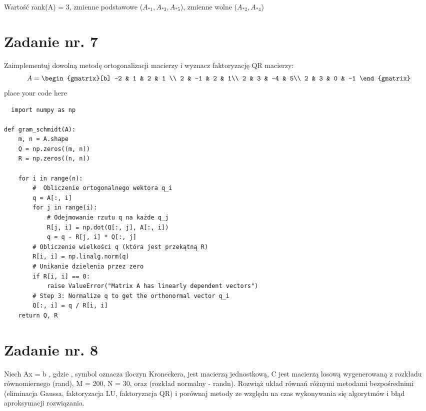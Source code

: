 \documentclass{article}
\begin{document}
Wartość rank(A) = 3, zmienne podstawowe ($A_{*1},A_{*3},A_{*5}$), zmienne wolne ($A_{*2},A_{*4}$)\\

\section{Zadanie nr. 7}
Zaimplementuj dowolną metodę ortogonalizacji macierzy i wyznacz faktoryzację
QR macierzy:
\begin{equation}
  A=
  \begin{gmatrix}[b]
  -2 & 1 & 2 & 1 \\
  2 & -1 & 2 & 1\\
  2 & 3 & -4 & 5\\
  2 & 3 & 0 & -1 
\end{gmatrix}
\end{equation}
place your code here

\begin{lstlisting}
  import numpy as np

def gram_schmidt(A):
    m, n = A.shape
    Q = np.zeros((m, n))
    R = np.zeros((n, n))

    for i in range(n):
        #  Obliczenie ortogonalnego wektora q_i
        q = A[:, i]
        for j in range(i):
            # Odejmowanie rzutu q na każde q_j
            R[j, i] = np.dot(Q[:, j], A[:, i])
            q = q - R[j, i] * Q[:, j]
        # Obliczenie wielkości q (która jest przekątną R)
        R[i, i] = np.linalg.norm(q)
        # Unikanie dzielenia przez zero
        if R[i, i] == 0:
            raise ValueError("Matrix A has linearly dependent vectors")
        # Step 3: Normalize q to get the orthonormal vector q_i
        Q[:, i] = q / R[i, i]
    return Q, R

\end{lstlisting}
\section{Zadanie nr. 8}

Niech Ax = b , gdzie , symbol  oznacza iloczyn Kroneckera,
 jest macierzą jednostkową,  C jest macierzą losową wygenerowaną z rozkładu
równomiernego (rand), M = 200, N = 30, oraz   (rozkład normalny - randn).
Rozwiąż układ równań różnymi metodami bezpośrednimi (eliminacja Gaussa, faktoryzacja LU,
faktoryzacja QR) i porównaj metody ze względu na czas wykonywania się algorytmów i błąd
aproksymacji rozwiązania.
\end{document}
